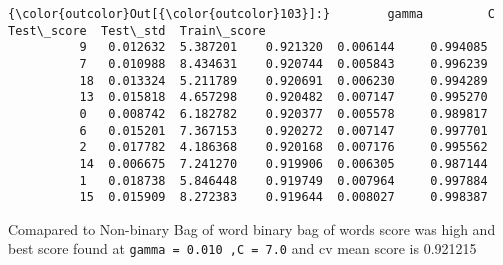 \documentclass[11pt]{article}
\begin{document}
\begin{Verbatim}[commandchars=\\\{\}]
{\color{outcolor}Out[{\color{outcolor}103}]:}        gamma         C  Test\_score  Test\_std  Train\_score
          9   0.012632  5.387201    0.921320  0.006144     0.994085
          7   0.010988  8.434631    0.920744  0.005843     0.996239
          18  0.013324  5.211789    0.920691  0.006230     0.994289
          13  0.015818  4.657298    0.920482  0.007147     0.995270
          0   0.008742  6.182782    0.920377  0.005578     0.989817
          6   0.015201  7.367153    0.920272  0.007147     0.997701
          2   0.017782  4.186368    0.920168  0.007176     0.995562
          14  0.006675  7.241270    0.919906  0.006305     0.987144
          1   0.018738  5.846448    0.919749  0.007964     0.997884
          15  0.015909  8.272383    0.919644  0.008027     0.998387
\end{Verbatim}
            
    Comapared to Non-binary Bag of word binary bag of words score was high
and best score found at \texttt{gamma\ =\ 0.010\ ,C\ =\ 7.0} and cv mean
score is 0.921215
\end{document}
